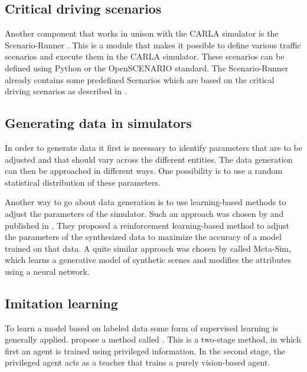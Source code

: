 \documentclass[conference, a4paper, 11pt]{IEEEtran}
\begin{document}
\subsection{Critical driving scenarios}

Another component that works in unison with the CARLA simulator is the Scenario-Runner \cite{CARLA:ScenarioRunner}.
This is a module that makes it possible to define various traffic scenarios and execute them in the CARLA simulator.
These scenarios can be defined using Python or the OpenSCENARIO \cite{OpenScenario} standard.
The Scenario-Runner already contains some predefined Scenarios which are based on the critical driving scenarios as described in  \cite{NHTSA:PreCrashScenarios}.

\subsection{Generating data in simulators}

In order to generate data it first is necessary to identify parameters that are to be adjusted and that should vary across the different entities.
The data generation can then be approached in different ways.
One possibility is to use a random statistical distribution of these parameters. 

Another way to go about data generation is to use learning-based methods to adjust the parameters of the simulator.
Such an approach was chosen by \citeauthor{DBLP:LearningToSimulate} and published in  \cite{DBLP:LearningToSimulate}.
They proposed a reinforcement learning-based method to adjust the parameters of the synthesized data to maximize the accuracy of a model trained on that data.
A quite similar approach was chosen by \citeauthor{DBLP:Meta-Sim} \cite{DBLP:Meta-Sim} called Meta-Sim, which learns a generative model of synthetic scenes and modifies the attributes using a neural network.

\subsection{Imitation learning}

To learn a model based on labeled data some form of supervised learning is generally applied.
\citeauthor{Chen:LearningByCheating} propose a method called  \cite{Chen:LearningByCheating}.
This is a two-stage method, in which first an agent is trained using privileged information.
In the second stage, the privileged agent acts as a teacher that trains a purely vision-based agent.
\end{document}
